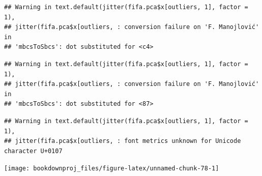 \documentclass[
]{article}
\newenvironment{Shaded}{\begin{snugshade}}{\end{snugshade}}
\newcommand{\AttributeTok}[1]{\textcolor[rgb]{0.77,0.63,0.00}{#1}}
\newcommand{\CommentTok}[1]{\textcolor[rgb]{0.56,0.35,0.01}{\textit{#1}}}
\newcommand{\DecValTok}[1]{\textcolor[rgb]{0.00,0.00,0.81}{#1}}
\newcommand{\FloatTok}[1]{\textcolor[rgb]{0.00,0.00,0.81}{#1}}
\newcommand{\FunctionTok}[1]{\textcolor[rgb]{0.00,0.00,0.00}{#1}}
\newcommand{\NormalTok}[1]{#1}
\newcommand{\OtherTok}[1]{\textcolor[rgb]{0.56,0.35,0.01}{#1}}
\newcommand{\SpecialCharTok}[1]{\textcolor[rgb]{0.00,0.00,0.00}{#1}}
\theoremstyle{definition}
\theoremstyle{definition}
\theoremstyle{definition}
\theoremstyle{definition}
\theoremstyle{remark}
\begin{document}
\begin{Shaded}
\end{Shaded}

\begin{verbatim}
## Warning in text.default(jitter(fifa.pca$x[outliers, 1], factor = 1),
## jitter(fifa.pca$x[outliers, : conversion failure on 'F. Manojlović' in
## 'mbcsToSbcs': dot substituted for <c4>
\end{verbatim}

\begin{verbatim}
## Warning in text.default(jitter(fifa.pca$x[outliers, 1], factor = 1),
## jitter(fifa.pca$x[outliers, : conversion failure on 'F. Manojlović' in
## 'mbcsToSbcs': dot substituted for <87>
\end{verbatim}

\begin{verbatim}
## Warning in text.default(jitter(fifa.pca$x[outliers, 1], factor = 1),
## jitter(fifa.pca$x[outliers, : font metrics unknown for Unicode character U+0107
\end{verbatim}

\begin{center}\texttt{[image: bookdownproj\_files/figure-latex/unnamed-chunk-78-1]} \end{center}
\end{document}
